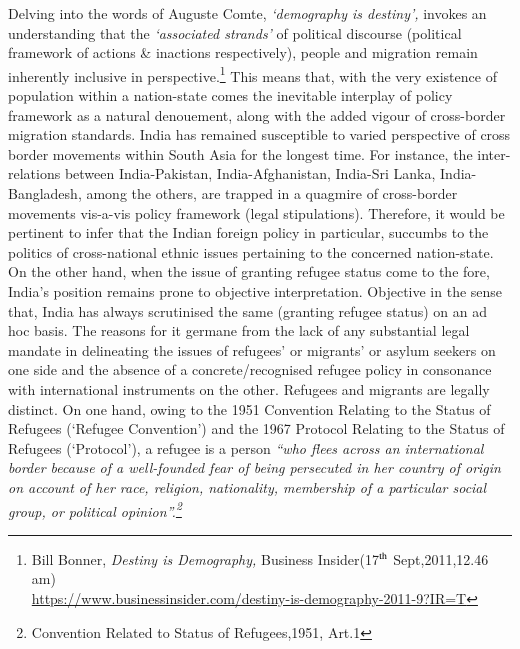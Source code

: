 \setcounter{figure}{0}
\setcounter{table}{0}

\label{2019-art1}

\begin{multicols}{2}


\vspace{-.2cm}

\noi
Delving into the words of Auguste Comte, \textit{‘demography is destiny’,} invokes an
understanding that the \textit{‘associated strands’} of political discourse (political framework of
actions \& inactions respectively), people and migration remain inherently inclusive in
perspective.\footnote{Bill Bonner, \textit{Destiny is Demography,} Business Insider(17$^{\rm th}$ Sept,2011,12.46 am)\\
\url{https://www.businessinsider.com/destiny-is-demography-2011-9?IR=T}}  This means that, with the very existence of population within a nation-state
comes the inevitable interplay of policy framework as a natural denouement, along with the
added vigour of cross-border migration standards. India has remained susceptible to varied
perspective of cross border movements within South Asia for the longest time. For instance,
the inter-relations between India-Pakistan, India-Afghanistan, India-Sri Lanka, India-Bangladesh, among the others, are trapped in a quagmire of cross-border movements vis-a-vis
policy framework (legal stipulations). Therefore, it would be pertinent to infer that the Indian
foreign policy in particular, succumbs to the politics of cross-national ethnic issues pertaining
to the concerned nation-state. On the other hand, when the issue of granting refugee status
come to the fore, India’s position remains prone to objective interpretation. Objective in the
sense that, India has always scrutinised the same (granting refugee status) on an ad hoc basis.
The reasons for it germane from the lack of any substantial legal mandate in delineating the
issues of refugees’ or migrants’ or asylum seekers on one side and the absence of a
concrete/recognised refugee policy in consonance with international instruments on the other.
Refugees and migrants are legally distinct. On one hand, owing to the 1951 Convention
Relating to the Status of Refugees (‘Refugee Convention’) and the 1967 Protocol Relating to
the Status of Refugees (‘Protocol’), a refugee is a person \textit{“who flees across an international
border because of a well-founded fear of being persecuted in her country of origin on account
of her race, religion, nationality, membership of a particular social group, or political
opinion”.\footnote{Convention Related to Status of Refugees,1951, Art.1}}


\end{multicols}
